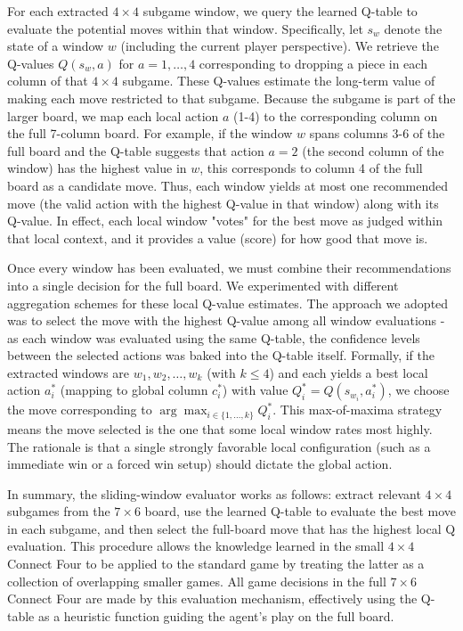 \documentclass[10pt]{extarticle}
\begin{document}
For each extracted $4 \times 4$ subgame window, we query the learned Q-table to evaluate the potential moves within that window. Specifically, let $s_w$ denote the state of a window $w$ (including the current player perspective). We retrieve the Q-values $Q(s_w, a)$ for $a=1,\dots,4$ corresponding to dropping a piece in each column of that $4 \times 4$ subgame. These Q-values estimate the long-term value of making each move restricted to that subgame. Because the subgame is part of the larger board, we map each local action $a$ (1-4) to the corresponding column on the full 7-column board. For example, if the window $w$ spans columns 3-6 of the full board and the Q-table suggests that action $a=2$ (the second column of the window) has the highest value in $w$, this corresponds to column 4 of the full board as a candidate move. Thus, each window yields at most one recommended move (the valid action with the highest Q-value in that window) along with its Q-value. In effect, each local window "votes" for the best move as judged within that local context, and it provides a value (score) for how good that move is.

Once every window has been evaluated, we must combine their recommendations into a single decision for the full board. We experimented with different aggregation schemes for these local Q-value estimates. The approach we adopted was to select the move with the highest Q-value among all window evaluations -  as each window was evaluated using the same Q-table, the confidence levels between the selected actions was baked into the Q-table itself. Formally, if the extracted windows are $w_1, w_2, \dots, w_k$ (with $k \le 4$) and each yields a best local action $a_i^*$ (mapping to global column $c_i^*$) with value $Q_i^* = Q(s_{w_i}, a_i^*)$, we choose the move corresponding to $\displaystyle \arg\max_{i \in \{1,\dots,k\}} Q_i^*$. This max-of-maxima strategy means the move selected is the one that some local window rates most highly. The rationale is that a single strongly favorable local configuration (such as a immediate win or a forced win setup) should dictate the global action.

In summary, the sliding-window evaluator works as follows: extract relevant $4 \times 4$ subgames from the $7 \times 6$ board, use the learned Q-table to evaluate the best move in each subgame, and then select the full-board move that has the highest local Q evaluation. This procedure allows the knowledge learned in the small $4 \times 4$ Connect Four to be applied to the standard game by treating the latter as a collection of overlapping smaller games. All game decisions in the full $7 \times 6$ Connect Four are made by this evaluation mechanism, effectively using the Q-table as a heuristic function guiding the agent's play on the full board.
\end{document}
